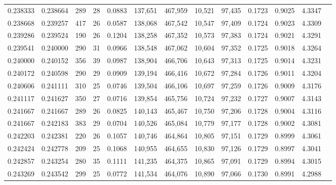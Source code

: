 \begin{tabular}{rrrrrrrrrrrrr}
0.238333 & 0.238664 &    289 &    28 &                                     0.0883 & 137,651 & 467,959 &  10,521 &  97,435 & 0.1723 & 0.9025 & 4.3347 \\
0.238668 & 0.239257 &    417 &    26 &                                     0.0587 & 138,068 & 467,542 &  10,547 &  97,409 & 0.1724 & 0.9023 & 4.3309 \\
0.239286 & 0.239524 &    190 &    26 &                                     0.1204 & 138,258 & 467,352 &  10,573 &  97,383 & 0.1724 & 0.9021 & 4.3291 \\
0.239541 & 0.240000 &    290 &    31 &                                     0.0966 & 138,548 & 467,062 &  10,604 &  97,352 & 0.1725 & 0.9018 & 4.3264 \\
0.240000 & 0.240152 &    356 &    39 &                                     0.0987 & 138,904 & 466,706 &  10,643 &  97,313 & 0.1725 & 0.9014 & 4.3231 \\
0.240172 & 0.240598 &    290 &    29 &                                     0.0909 & 139,194 & 466,416 &  10,672 &  97,284 & 0.1726 & 0.9011 & 4.3204 \\
0.240606 & 0.241111 &    310 &    25 &                                     0.0746 & 139,504 & 466,106 &  10,697 &  97,259 & 0.1726 & 0.9009 & 4.3176 \\
0.241117 & 0.241627 &    350 &    27 &                                     0.0716 & 139,854 & 465,756 &  10,724 &  97,232 & 0.1727 & 0.9007 & 4.3143 \\
0.241667 & 0.241667 &    289 &    26 &                                     0.0825 & 140,143 & 465,467 &  10,750 &  97,206 & 0.1728 & 0.9004 & 4.3116 \\
0.241667 & 0.242183 &    383 &    29 &                                     0.0704 & 140,526 & 465,084 &  10,779 &  97,177 & 0.1728 & 0.9002 & 4.3081 \\
0.242203 & 0.242381 &    220 &    26 &                                     0.1057 & 140,746 & 464,864 &  10,805 &  97,151 & 0.1729 & 0.8999 & 4.3061 \\
0.242424 & 0.242778 &    209 &    25 &                                     0.1068 & 140,955 & 464,655 &  10,830 &  97,126 & 0.1729 & 0.8997 & 4.3041 \\
0.242857 & 0.243254 &    280 &    35 &                                     0.1111 & 141,235 & 464,375 &  10,865 &  97,091 & 0.1729 & 0.8994 & 4.3015 \\
0.243269 & 0.243542 &    299 &    25 &                                     0.0772 & 141,534 & 464,076 &  10,890 &  97,066 & 0.1730 & 0.8991 & 4.2988 \\

\end{tabular}
